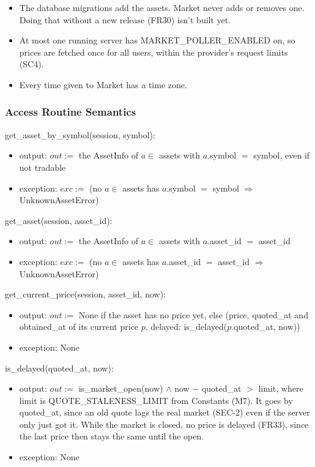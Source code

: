 \documentclass[12pt, titlepage]{article}
\begin{document}
\begin{itemize}
\item The database migrations add the assets. Market never adds or removes one.
  Doing that without a new release (FR30) isn't built yet.
\item At most one running server has MARKET\_POLLER\_ENABLED on, so prices are
  fetched once for all users, within the provider's request limits (SC4).
\item Every time given to Market has a time zone.
\end{itemize}

\subsubsection{Access Routine Semantics}

\noindent get\_asset\_by\_symbol(session, symbol):
\begin{itemize}
\item output: $out := $ the AssetInfo of $a \in$ assets with $a$.symbol $=$
  symbol, even if not tradable
\item exception: $exc := $ (no $a \in$ assets has $a$.symbol $=$ symbol
  $\Rightarrow$ UnknownAssetError)
\end{itemize}

\noindent get\_asset(session, asset\_id):
\begin{itemize}
\item output: $out := $ the AssetInfo of $a \in$ assets with $a$.asset\_id $=$
  asset\_id
\item exception: $exc := $ (no $a \in$ assets has $a$.asset\_id $=$ asset\_id
  $\Rightarrow$ UnknownAssetError)
\end{itemize}

\noindent get\_current\_price(session, asset\_id, now):
\begin{itemize}
\item output: $out := $ None if the asset has no price yet, else (price,
  quoted\_at and obtained\_at of its current price $p$, delayed:
  is\_delayed($p$.quoted\_at, now))
\item exception: None
\end{itemize}

\noindent is\_delayed(quoted\_at, now):
\begin{itemize}
\item output: $out := $ is\_market\_open(now) $\land$ now $-$ quoted\_at $>$
  limit, where limit is QUOTE\_STALENESS\_LIMIT from Constants (M7). It goes
  by quoted\_at, since an old quote lags the real market (SEC-2) even if the
  server only just got it. While the market is closed, no price is delayed
  (FR33), since the last price then stays the same until the open.
\item exception: None
\end{itemize}
\end{document}
